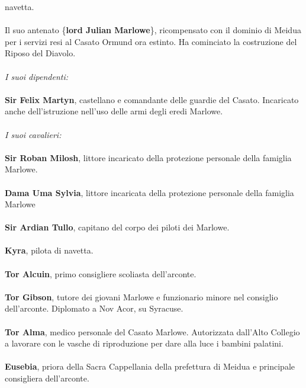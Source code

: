 navetta.
\leavevmode\\
\leavevmode\\
\phantom{123}Il suo antenato \{\textbf{lord Julian Marlowe}\}, ricompensato con il
dominio di Meidua per i servizi resi al Casato Ormund ora estinto. Ha
cominciato la costruzione del Riposo del Diavolo.
\leavevmode\\
\leavevmode\\
\textit{I suoi dipendenti:}
\leavevmode\\
\leavevmode\\
\phantom{123}\textbf{Sir Felix Martyn}, castellano e comandante delle guardie del
Casato. Incaricato anche dell'istruzione nell'uso delle armi degli eredi
Marlowe.
\leavevmode\\
\leavevmode\\
\textit{I suoi cavalieri:}
\leavevmode\\
\leavevmode\\
\phantom{123}\textbf{Sir Roban Milosh}, littore incaricato della protezione personale
della famiglia Marlowe.
\leavevmode\\
\leavevmode\\
\phantom{123}\textbf{Dama Uma Sylvia}, littore incaricata della protezione personale
della famiglia Marlowe
\leavevmode\\
\leavevmode\\
\phantom{123}\textbf{Sir Ardian Tullo}, capitano del corpo dei piloti dei Marlowe.
\leavevmode\\
\leavevmode\\
\phantom{123}\textbf{Kyra}, pilota di navetta.
\leavevmode\\
\leavevmode\\
\phantom{123}\textbf{Tor Alcuin}, primo consigliere scoliasta dell'arconte.
\leavevmode\\
\leavevmode\\
\phantom{123}\textbf{Tor Gibson}, tutore dei giovani Marlowe e funzionario minore nel
consiglio dell'arconte. Diplomato a Nov Acor, su Syracuse.
\leavevmode\\
\leavevmode\\
\phantom{123}\textbf{Tor Alma}, medico personale del Casato Marlowe. Autorizzata
dall'Alto Collegio a lavorare con le vasche di riproduzione per dare
alla luce i bambini palatini.
\leavevmode\\
\leavevmode\\
\phantom{123}\textbf{Eusebia}, priora della Sacra Cappellania della prefettura di
Meidua e principale consigliera dell'arconte.
